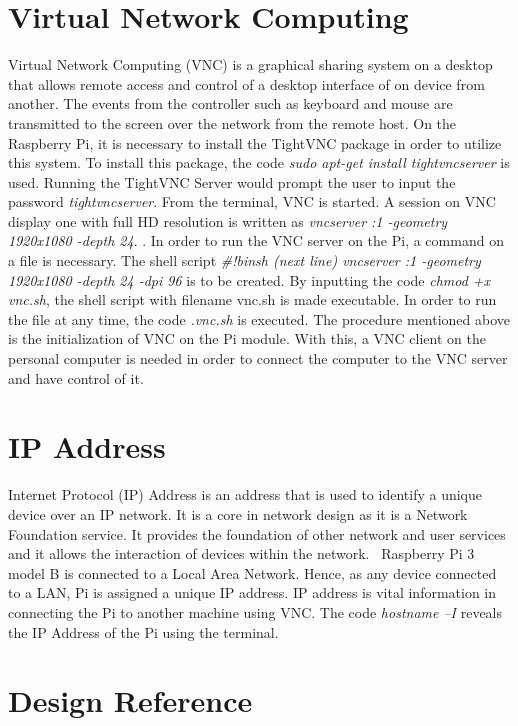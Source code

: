 \section{Virtual Network Computing}
Virtual Network Computing (VNC) is a graphical sharing system on a desktop that allows remote access and control of a desktop interface of on device from another. The events from the controller such as keyboard and mouse are transmitted to the screen over the network from the remote host. 
	On the Raspberry Pi, it is necessary to install the TightVNC package in order to utilize this system. To install this package, the code  \textsl{sudo apt-get install tightvncserver} is used. Running the TightVNC Server would prompt the user to input the password \textsl{tightvncserver}. From the terminal, VNC is started. A session on VNC display one with full HD resolution is written as \textsl{vncserver :1 -geometry 1920x1080 -depth 24}.
.	In order to run the VNC server on the Pi, a command on a file is necessary. The shell script \textsl{\#!\/bin\/sh (next line) vncserver :1 -geometry 1920x1080 -depth 24 -dpi 96} is to be created. By inputting the code \textsl{chmod +x vnc.sh}, the shell script with filename vnc.sh is made executable. In order to run the file at any time, the code \textsl{.\/vnc.sh} is executed.
	The procedure mentioned above is the initialization of VNC on the Pi module. With this, a VNC client on the personal computer is needed in order to connect the computer to the VNC server and have control of it.~\cite{vnc}
	
\section{IP Address}
	Internet Protocol (IP) Address is an address that is used to identify a unique device over an IP network. It is a core in network design as it is a Network Foundation service. It provides the foundation of other network and user services and it allows the interaction of devices within the network.~\cite{cisco}
	Raspberry Pi 3 model B is connected to a Local Area Network. Hence, as any device connected to a LAN, Pi is assigned a unique IP address. IP address is vital information in connecting the Pi to another machine using VNC. The code \textsl{hostname –I} reveals the IP Address of the Pi using the terminal.
		
\section{Design Reference}

